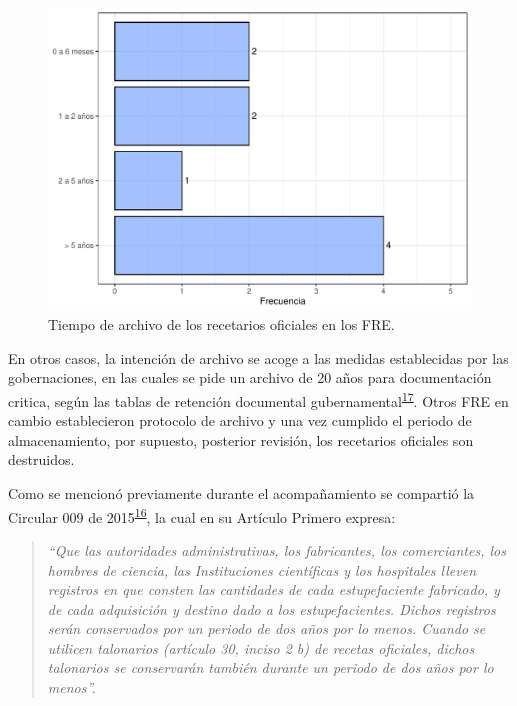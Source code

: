\documentclass[
]{book}
\begin{document}
\begin{figure}[t]

{\centering \includegraphics[width=0.85\linewidth]{InformeFinal_files/figure-latex/TiempoArchivoRecetariosOficiales-1} 

}

\caption{Tiempo de archivo de los recetarios oficiales en los FRE.}\label{fig:TiempoArchivoRecetariosOficiales}
\end{figure}

En otros casos, la intención de archivo se acoge a las medidas establecidas por las gobernaciones, en las cuales se pide un archivo de 20 años para documentación critica, según las tablas de retención documental gubernamental\textsuperscript{\protect\hyperlink{ref-PresidenciadelaRepublicadeColombia2012}{17}}. Otros FRE en cambio establecieron protocolo de archivo y una vez cumplido el periodo de almacenamiento, por supuesto, posterior revisión, los recetarios oficiales son destruidos.

Como se mencionó previamente durante el acompañamiento se compartió la Circular 009 de 2015\textsuperscript{\protect\hyperlink{ref-FNE2015-9}{16}}, la cual en su Artículo Primero expresa:

\begin{quote}
\emph{``Que las autoridades administrativas, los fabricantes, los comerciantes, los hombres de ciencia, las Instituciones científicas y los hospitales lleven registros en que consten las cantidades de cada estupefaciente fabricado, y de cada adquisición y destino dado a los estupefacientes. Dichos registros serán conservados por un periodo de dos años por lo menos. Cuando se utilicen talonarios (artículo 30, inciso 2 b) de recetas oficiales, dichos talonarios se conservarán también durante un periodo de dos años por lo menos''.}
\end{quote}
\end{document}
